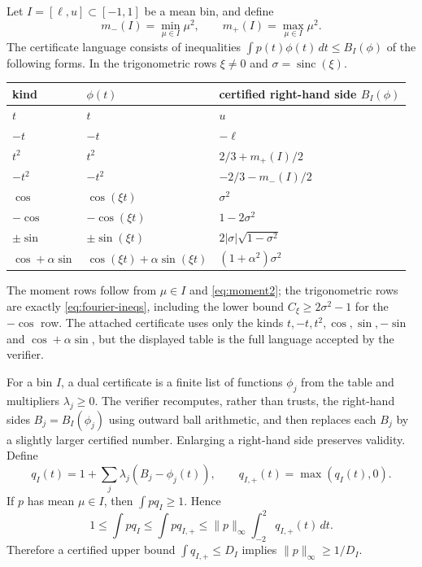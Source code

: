 \documentclass[a4paper]{amsart}
\DeclareMathOperator{\sinc}{sinc}
\newcommand{\dd}{\,d}
\begin{document}
Let $I=[\ell,u]\subset[-1,1]$ be a mean bin, and define
\[
 m_-(I)=\min_{\mu\in I}\mu^2,
 \qquad m_+(I)=\max_{\mu\in I}\mu^2.
\]
The certificate language consists of inequalities $\int p(t)\phi(t)\dd t\le B_I(\phi)$ of the following forms.  In the trigonometric rows $\xi\ne0$ and $\sigma=\sinc(\xi)$.

\begin{center}
\begin{tabular}{lll}
\toprule
kind & $\phi(t)$ & certified right-hand side $B_I(\phi)$ \\
\midrule
$t$ & $t$ & $u$ \\
$-t$ & $-t$ & $-\ell$ \\
$t^2$ & $t^2$ & $2/3+m_+(I)/2$ \\
$-t^2$ & $-t^2$ & $-2/3-m_-(I)/2$ \\
$\cos$ & $\cos(\xi t)$ & $\sigma^2$ \\
$-\cos$ & $-\cos(\xi t)$ & $1-2\sigma^2$ \\
$\pm\sin$ & $\pm\sin(\xi t)$ & $2|\sigma|\sqrt{1-\sigma^2}$ \\
$\cos+\alpha\sin$ & $\cos(\xi t)+\alpha\sin(\xi t)$ & $(1+\alpha^2)\sigma^2$ \\
\bottomrule
\end{tabular}
\end{center}

The moment rows follow from $\mu\in I$ and \eqref{eq:moment2}; the trigonometric rows are exactly \eqref{eq:fourier-ineqs}, including the lower bound $C_\xi\ge2\sigma^2-1$ for the $-\cos$ row.  The attached certificate uses only the kinds $t,-t,t^2,\cos,\sin,-\sin$ and $\cos+\alpha\sin$, but the displayed table is the full language accepted by the verifier.

For a bin $I$, a dual certificate is a finite list of functions $\phi_j$ from the table and multipliers $\lambda_j\ge0$.  The verifier recomputes, rather than trusts, the right-hand sides $B_j=B_I(\phi_j)$ using outward ball arithmetic, and then replaces each $B_j$ by a slightly larger certified number.  Enlarging a right-hand side preserves validity.  Define
\[
 q_I(t)=1+\sum_j\lambda_j(B_j-\phi_j(t)),\qquad q_{I,+}(t)=\max(q_I(t),0).
\]
If $p$ has mean $\mu\in I$, then $\int p q_I\ge1$.  Hence
\begin{equation}\label{eq:dual-bound}
 1\le\int p q_I\le\int p q_{I,+}\le\|p\|_\infty\int_{-2}^2 q_{I,+}(t)\dd t.
\end{equation}
Therefore a certified upper bound $\int q_{I,+}\le D_I$ implies $\|p\|_\infty\ge1/D_I$.
\end{document}
